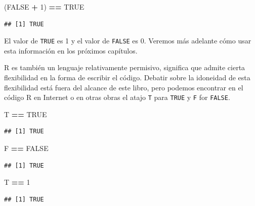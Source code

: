 \documentclass[]{book}
\newenvironment{Shaded}{\begin{snugshade}}{\end{snugshade}}
\newcommand{\DecValTok}[1]{\textcolor[rgb]{0.00,0.00,0.81}{#1}}
\newcommand{\StringTok}[1]{\textcolor[rgb]{0.31,0.60,0.02}{#1}}
\newcommand{\OtherTok}[1]{\textcolor[rgb]{0.56,0.35,0.01}{#1}}
\newcommand{\OperatorTok}[1]{\textcolor[rgb]{0.81,0.36,0.00}{\textbf{#1}}}
\newcommand{\NormalTok}[1]{#1}
\begin{document}
\begin{Shaded}
\begin{Highlighting}[]
\NormalTok{(}\OtherTok{FALSE} \OperatorTok{+}\StringTok{ }\DecValTok{1}\NormalTok{) }\OperatorTok{==}\StringTok{ }\OtherTok{TRUE}
\end{Highlighting}
\end{Shaded}

\begin{verbatim}
## [1] TRUE
\end{verbatim}

El valor de \texttt{TRUE} es 1 y el valor de \texttt{FALSE} es 0.
Veremos más adelante cómo usar esta información en los próximos
capítulos.

R es también un lenguaje relativamente permisivo, significa que admite
cierta flexibilidad en la forma de escribir el código. Debatir sobre la
idoneidad de esta flexibilidad está fuera del alcance de este libro,
pero podemos encontrar en el código R en Internet o en otras obras el
atajo \texttt{T} para \texttt{TRUE} y \texttt{F} for \texttt{FALSE}.

\begin{Shaded}
\begin{Highlighting}[]
\NormalTok{T }\OperatorTok{==}\StringTok{ }\OtherTok{TRUE}
\end{Highlighting}
\end{Shaded}

\begin{verbatim}
## [1] TRUE
\end{verbatim}

\begin{Shaded}
\begin{Highlighting}[]
\NormalTok{F }\OperatorTok{==}\StringTok{ }\OtherTok{FALSE}
\end{Highlighting}
\end{Shaded}

\begin{verbatim}
## [1] TRUE
\end{verbatim}

\begin{Shaded}
\begin{Highlighting}[]
\NormalTok{T }\OperatorTok{==}\StringTok{ }\DecValTok{1}
\end{Highlighting}
\end{Shaded}

\begin{verbatim}
## [1] TRUE
\end{verbatim}
\end{document}

